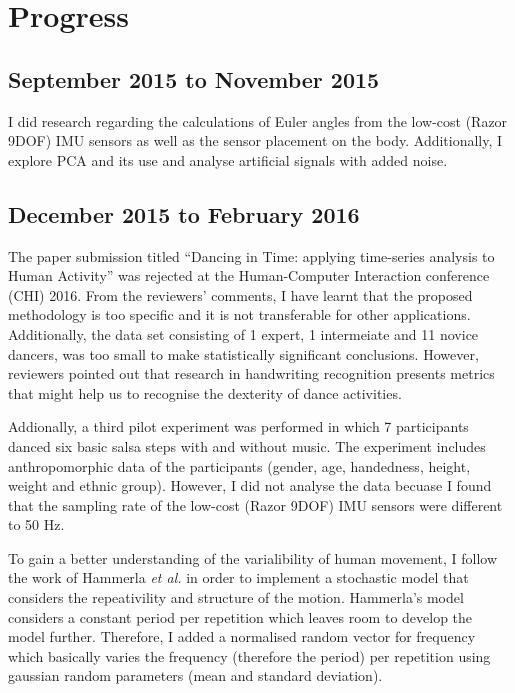 \documentclass[11pt,journal,onecolumn,compsoc]{IEEEtran}
\begin{document}
\section{Progress}

\subsection{September 2015 to November 2015}

I did research regarding the calculations of Euler angles from the
low-cost (Razor 9DOF) IMU sensors as well as the sensor placement on the body.
Additionally, I explore PCA and its use and analyse artificial signals with added noise.




\subsection{December 2015 to February 2016}
The paper submission titled ``Dancing in Time: applying time-series analysis to Human Activity''
was rejected at the Human-Computer Interaction conference (CHI) 2016. From the reviewers' comments, 
I have learnt that the proposed methodology is too specific and it is not transferable for other applications.
Additionally, the data set consisting of 1 expert, 
1 intermeiate and 11 novice dancers, was too small to make statistically significant conclusions.
However, reviewers pointed out that research in handwriting recognition presents metrics 
that might help us to recognise the dexterity of dance activities.

Addionally, a third pilot experiment was performed in which 7 participants danced 
six basic salsa steps with and without music.
The experiment includes anthropomorphic data of the participants 
(gender, age, handedness, height, weight and ethnic group).
However, I did not analyse the data becuase I found that the
 sampling rate of the low-cost (Razor 9DOF) IMU sensors were different to 50 Hz.

To gain a better understanding of the varialibility of human movement,
I follow the work of Hammerla  \textit{et al.} \cite{Hammerla2011} in order to implement a stochastic model 
that considers the repeativility and structure of the motion.
Hammerla's model considers a constant period per repetition
which leaves room to develop the model further.
Therefore, I added a normalised random vector for frequency which basically varies the frequency 
(therefore the period) per repetition using gaussian random parameters (mean and standard deviation).
\end{document}
